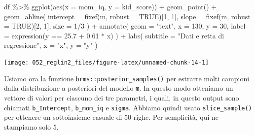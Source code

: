 \documentclass[
  10pt,
  italian,
  a4paper,
  extrafontsizes,onecolumn,openright
  ]{memoir}
\newenvironment{Shaded}{\begin{snugshade}}{\end{snugshade}}
\newcommand{\AttributeTok}[1]{\textcolor[rgb]{0.77,0.63,0.00}{#1}}
\newcommand{\ConstantTok}[1]{\textcolor[rgb]{0.00,0.00,0.00}{#1}}
\newcommand{\DecValTok}[1]{\textcolor[rgb]{0.00,0.00,0.81}{#1}}
\newcommand{\FloatTok}[1]{\textcolor[rgb]{0.00,0.00,0.81}{#1}}
\newcommand{\FunctionTok}[1]{\textcolor[rgb]{0.00,0.00,0.00}{#1}}
\newcommand{\NormalTok}[1]{#1}
\newcommand{\SpecialCharTok}[1]{\textcolor[rgb]{0.00,0.00,0.00}{#1}}
\newcommand{\StringTok}[1]{\textcolor[rgb]{0.31,0.60,0.02}{#1}}
\begin{document}
\begin{Shaded}
\begin{Highlighting}[]
\NormalTok{df }\SpecialCharTok{\%\textgreater{}\%} 
  \FunctionTok{ggplot}\NormalTok{(}\FunctionTok{aes}\NormalTok{(}\AttributeTok{x =}\NormalTok{ mom\_iq, }\AttributeTok{y =}\NormalTok{ kid\_score)) }\SpecialCharTok{+}
  \FunctionTok{geom\_point}\NormalTok{() }\SpecialCharTok{+}
  \FunctionTok{geom\_abline}\NormalTok{(}
    \AttributeTok{intercept =} \FunctionTok{fixef}\NormalTok{(m, }\AttributeTok{robust =} \ConstantTok{TRUE}\NormalTok{)[}\DecValTok{1}\NormalTok{, }\DecValTok{1}\NormalTok{], }
    \AttributeTok{slope =} \FunctionTok{fixef}\NormalTok{(m, }\AttributeTok{robust =} \ConstantTok{TRUE}\NormalTok{)[}\DecValTok{2}\NormalTok{, }\DecValTok{1}\NormalTok{],}
    \AttributeTok{size =} \DecValTok{1}\SpecialCharTok{/}\DecValTok{3}
\NormalTok{  ) }\SpecialCharTok{+}
  \FunctionTok{annotate}\NormalTok{(}
    \AttributeTok{geom =} \StringTok{"text"}\NormalTok{,}
    \AttributeTok{x =} \DecValTok{130}\NormalTok{, }\AttributeTok{y =} \DecValTok{30}\NormalTok{,}
    \AttributeTok{label =} \FunctionTok{expression}\NormalTok{(y }\SpecialCharTok{==} \FloatTok{25.7} \SpecialCharTok{+} \FloatTok{0.61} \SpecialCharTok{*}\NormalTok{ x)}
\NormalTok{  ) }\SpecialCharTok{+}
  \FunctionTok{labs}\NormalTok{(}
    \AttributeTok{subtitle =} \StringTok{"Dati e retta di regressione"}\NormalTok{,}
    \AttributeTok{x =} \StringTok{"x"}\NormalTok{,}
    \AttributeTok{y =} \StringTok{"y"}
\NormalTok{  )}
\end{Highlighting}
\end{Shaded}

\begin{center}\texttt{[image: 052\_reglin2\_files/figure-latex/unnamed-chunk-14-1]} \end{center}

Usiamo ora la funzione \texttt{brms::posterior\_samples()} per estrarre molti campioni dalla distribuzione a posteriori del modello \texttt{m}. In questo modo otteniamo un vettore di valori per ciascuno dei tre parametri, i quali, in questo output sono chiamati \texttt{b\_Intercept}, \texttt{b\_mom\_iq} e \texttt{sigma}. Abbiamo quindi usato \texttt{slice\_sample()} per ottenere un sottoinsieme casuale di 50 righe. Per semplicità, qui ne stampiamo solo 5.
\end{document}
